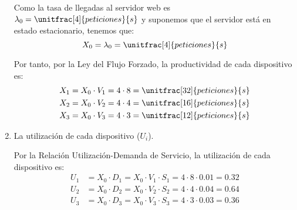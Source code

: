 \begin{ejercicio}
\begin{enumerate}
        Como la tasa de llegadas al servidor web es $\lambda_0 = \unitfrac[4]{peticiones}{s}$ y suponemos que el servidor está en estado estacionario, tenemos que:
        \begin{equation*}
            X_0 = \lambda_0 = \unitfrac[4]{peticiones}{s}
        \end{equation*}

        Por tanto, por la Ley del Flujo Forzado, la productividad de cada dispositivo es:
        \begin{align*}
            X_1 &= X_0 \cdot V_1 = 4 \cdot 8 = \unitfrac[32]{peticiones}{s} \\
            X_2 &= X_0 \cdot V_2 = 4 \cdot 4 = \unitfrac[16]{peticiones}{s} \\
            X_3 &= X_0 \cdot V_3 = 4 \cdot 3 = \unitfrac[12]{peticiones}{s}
        \end{align*}
        \item La utilización de cada dispositivo ($U_i$).
        
        Por la Relación Utilización-Demanda de Servicio, la utilización de cada dispositivo es:
        \begin{align*}
            U_1 &= X_0 \cdot D_1 = X_0\cdot V_1 \cdot S_1 = 4 \cdot 8 \cdot 0.01 = 0.32 \\
            U_2 &= X_0 \cdot D_2 = X_0\cdot V_2 \cdot S_2 = 4 \cdot 4 \cdot 0.04 = 0.64 \\
            U_3 &= X_0 \cdot D_3 = X_0\cdot V_3 \cdot S_3 = 4 \cdot 3 \cdot 0.03 = 0.36
        \end{align*}
    \end{enumerate}
\end{ejercicio}
\begin{comment}
\solucion
    \begin{enumerate}
        \item $D_1 = 0.08$, $D_2 = 0.16$, $D_3 = 0.09$ (expresados en segundos o, más concretamente, segundos/petición).
        \item $R_0 = 0.7027$ segundos.
        \item $N_0 = 2.8108$ peticiones.
        \item $X_1 = 32$, $X_2 = 16$, $X_3 = 12$ (expresados en peticiones/s).
        \item $U_1 = 0.32$, $U_2 = 0.64$, $U_3 = 0.36$.
    \end{enumerate}
\end{comment}

